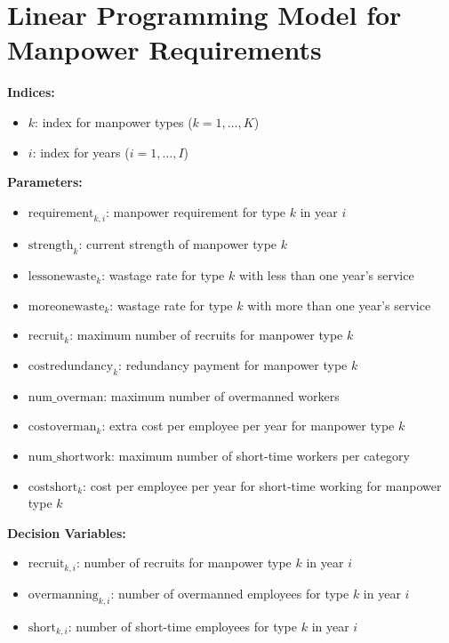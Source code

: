 \documentclass{article}
\begin{document}
\section*{Linear Programming Model for Manpower Requirements}

\textbf{Indices:}
\begin{itemize}
    \item \( k \): index for manpower types (\( k = 1, \ldots, K \))
    \item \( i \): index for years (\( i = 1, \ldots, I \))
\end{itemize}

\textbf{Parameters:}
\begin{itemize}
    \item \( \text{requirement}_{k, i} \): manpower requirement for type \( k \) in year \( i \)
    \item \( \text{strength}_{k} \): current strength of manpower type \( k \)
    \item \( \text{lessonewaste}_{k} \): wastage rate for type \( k \) with less than one year's service
    \item \( \text{moreonewaste}_{k} \): wastage rate for type \( k \) with more than one year's service
    \item \( \text{recruit}_{k} \): maximum number of recruits for manpower type \( k \)
    \item \( \text{costredundancy}_{k} \): redundancy payment for manpower type \( k \)
    \item \( \text{num\_overman} \): maximum number of overmanned workers
    \item \( \text{costoverman}_{k} \): extra cost per employee per year for manpower type \( k \)
    \item \( \text{num\_shortwork} \): maximum number of short-time workers per category
    \item \( \text{costshort}_{k} \): cost per employee per year for short-time working for manpower type \( k \)
\end{itemize}

\textbf{Decision Variables:}
\begin{itemize}
    \item \( \text{recruit}_{k, i} \): number of recruits for manpower type \( k \) in year \( i \)
    \item \( \text{overmanning}_{k, i} \): number of overmanned employees for type \( k \) in year \( i \)
    \item \( \text{short}_{k, i} \): number of short-time employees for type \( k \) in year \( i \)
\end{itemize}
\end{document}
